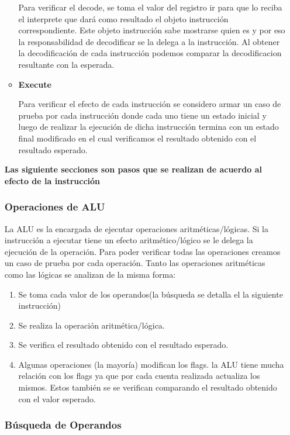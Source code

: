 \begin{enumerate}
\begin{itemize}
Para verificar el decode, se toma el valor del registro ir para que lo reciba el interprete que dará como resultado el objeto instrucción correspondiente. Este objeto instrucción sabe mostrarse quien es y por eso la responsabilidad de decodificar se la delega a la instrucción. Al obtener la decodificación de cada instrucción podemos comparar la decodificacion resultante con la esperada.
 
\item \textbf{Execute}

Para verificar el efecto de cada instrucción se considero armar un caso de prueba por cada instrucción donde cada uno tiene un estado inicial y luego de realizar la ejecución de dicha instrucción termina con un estado final modificado en el cual verificamos el resultado obtenido con el resultado esperado. 
\end{itemize}

\textbf{Las siguiente secciones son pasos que se realizan de acuerdo al efecto de la instrucción}
  
\subsubsection{Operaciones de ALU}

La ALU es la encargada de ejecutar operaciones aritméticas/lógicas. Si la instrucción a ejecutar tiene un efecto aritmético/lógico se le delega la ejecución de la operación. Para poder verificar todas las operaciones creamos un caso de prueba por cada operación. Tanto las operaciones aritméticas como las lógicas se analizan de la misma forma:

\begin{enumerate}
\item Se toma cada valor de los operandos(la búsqueda se detalla el la siguiente instrucción)

\item Se realiza la operación aritmética/lógica. 

\item Se verifica el resultado obtenido con el resultado esperado.

\item Algunas operaciones (la mayoría) modifican los flags. la ALU tiene mucha relación con los flags ya que por cada cuenta realizada actualiza los mismos. Estos también se se verifican comparando el resultado obtenido con el valor esperado. 
\end{enumerate}

\subsubsection{Búsqueda de Operandos}


\end{enumerate}
